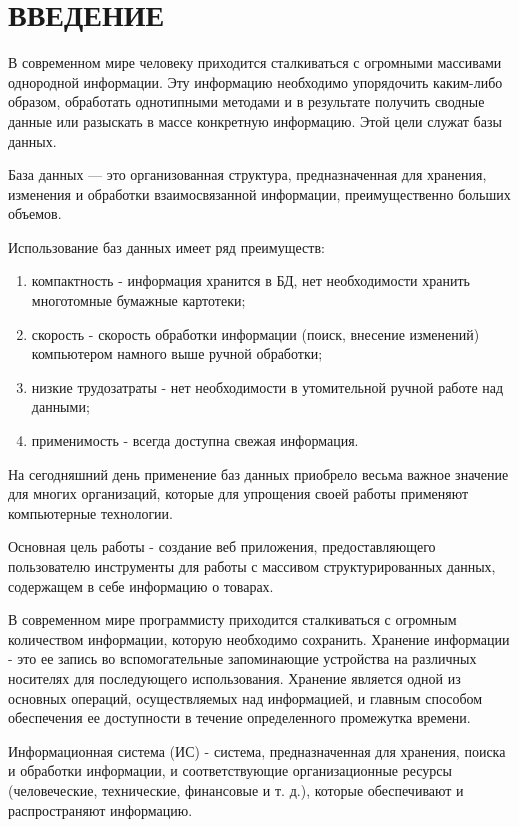 \newpage

\section*{ВВЕДЕНИЕ} %

В современном мире человеку приходится сталкиваться с огромными массивами однородной информации.
Эту информацию необходимо упорядочить каким-либо образом, обработать однотипными методами
и в результате получить сводные данные или разыскать в массе конкретную информацию.
Этой цели служат базы данных.

База данных — это организованная структура, предназначенная для хранения,
изменения и обработки взаимосвязанной информации, преимущественно больших объемов.

Использование баз данных имеет ряд преимуществ:

\begin{enumerate}
    \item компактность - информация хранится в БД, нет необходимости хранить
    многотомные бумажные картотеки;
    \item скорость - скорость обработки информации (поиск, внесение изменений)
    компьютером намного выше ручной обработки;
    \item низкие трудозатраты - нет необходимости в утомительной ручной работе над данными;
    \item применимость - всегда доступна свежая информация.
\end{enumerate}

На сегодняшний день применение баз данных приобрело весьма важное значение для многих организаций,
которые для упрощения своей работы применяют компьютерные технологии.

Основная цель работы - создание веб приложения, предоставляющего пользователю инструменты для работы
с массивом структурированных данных, содержащем в себе информацию о товарах.

В современном мире программисту приходится сталкиваться с огромным количеством информации,
которую необходимо сохранить.
Хранение информации - это ее запись во вспомогательные запоминающие устройства на различных носителях
для последующего использования.
Хранение является одной из основных операций, осуществляемых над информацией,
и главным способом обеспечения ее доступности в течение определенного промежутка времени.

Информационная система (ИС) - система, предназначенная для хранения, поиска и обработки информации,
и соответствующие организационные ресурсы (человеческие, технические, финансовые и т. д.),
которые обеспечивают и распространяют информацию.

